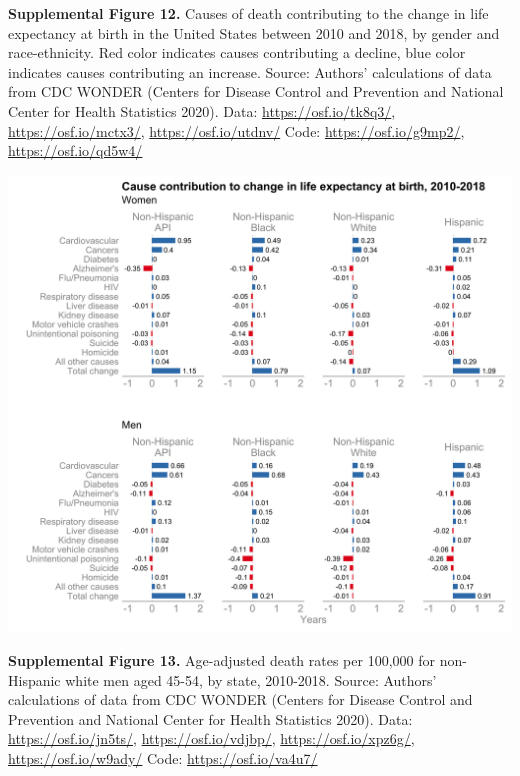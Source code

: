 \documentclass[
  11pt,
]{article}
\begin{document}
\newpage

\textbf{Supplemental Figure 12.} Causes of death contributing to the
change in life expectancy at birth in the United States between 2010 and
2018, by gender and race-ethnicity. Red color indicates causes
contributing a decline, blue color indicates causes contributing an
increase. Source: Authors' calculations of data from CDC WONDER (Centers
for Disease Control and Prevention and National Center for Health
Statistics 2020). Data: \url{https://osf.io/tk8q3/},
\url{https://osf.io/mctx3/}, \url{https://osf.io/utdnv/} Code:
\url{https://osf.io/g9mp2/}, \url{https://osf.io/qd5w4/}

\includegraphics[width=1\linewidth]{../figures/le-cause-decomp-2010-2018}

\newpage

\textbf{Supplemental Figure 13.} Age-adjusted death rates per 100,000
for non-Hispanic white men aged 45-54, by state, 2010-2018. Source:
Authors' calculations of data from CDC WONDER (Centers for Disease
Control and Prevention and National Center for Health Statistics 2020).
Data: \url{https://osf.io/jn5ts/}, \url{https://osf.io/vdjbp/},
\url{https://osf.io/xpz6g/}, \url{https://osf.io/w9ady/} Code:
\url{https://osf.io/va4u7/}
\end{document}
